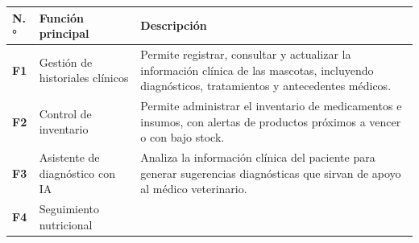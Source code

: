 \documentclass[
]{article}
\newcounter{none} %
\begin{document}
{\def\LTcaptype{none} %
\begin{longtable}[]{|
  >{\centering\arraybackslash}p{}|
  >{\raggedright\arraybackslash}p{}|
  >{\raggedright\arraybackslash}p{}|}
\hline
\begin{minipage}[b]{\linewidth}\centering
\textbf{N.°}
\end{minipage} & \begin{minipage}[b]{\linewidth}\raggedright
\textbf{Función principal}
\end{minipage} & \begin{minipage}[b]{\linewidth}\centering
\textbf{Descripción}
\end{minipage} \\
\hline
\endhead
\hline
\endlastfoot
\textbf{F1} & \begin{minipage}[t]{\linewidth}\raggedright
Gestión de historiales clínicos
\end{minipage} & \begin{minipage}[t]{\linewidth}\raggedright
Permite registrar, consultar y actualizar la información clínica de las
mascotas, incluyendo diagnósticos, tratamientos y antecedentes médicos.
\end{minipage} \\
\hline
\textbf{F2} & \begin{minipage}[t]{\linewidth}\raggedright
Control de inventario
\end{minipage} & \begin{minipage}[t]{\linewidth}\raggedright
Permite administrar el inventario de medicamentos e insumos, con alertas de productos próximos a vencer o con bajo stock.
\end{minipage} \\
\hline
\textbf{F3} & \begin{minipage}[t]{\linewidth}\raggedright
Asistente de diagnóstico con IA
\end{minipage} & \begin{minipage}[t]{\linewidth}\raggedright
Analiza la información clínica del paciente para generar sugerencias
diagnósticas que sirvan de apoyo al médico veterinario.
\end{minipage} \\
\hline
\textbf{F4} & \begin{minipage}[t]{\linewidth}\raggedright
Seguimiento nutricional
\end{minipage} & \begin{minipage}[t]{\linewidth}\raggedright

\end{minipage}
\end{longtable}}
\end{document}
